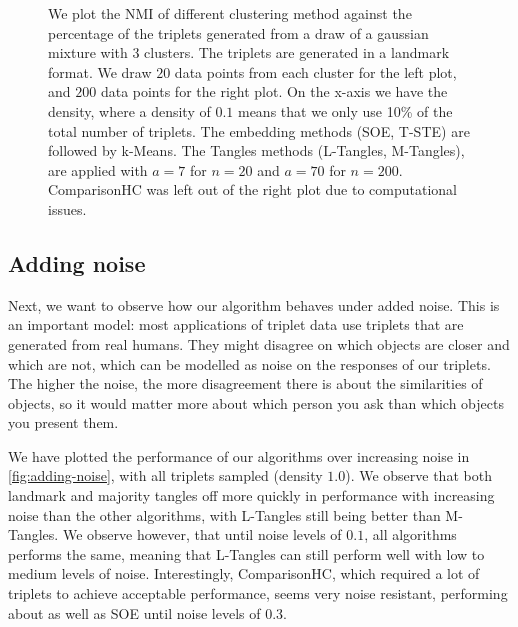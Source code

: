 \onecolumn
\begin{figure}[ht]
    \centering
    \caption{
        We plot the NMI of different clustering method against the percentage of the triplets generated from a draw of a gaussian mixture with $3$ clusters. The triplets are generated in a landmark format.
        We draw $20$ data points from each cluster for the left plot, and $200$ data points for the right plot.
        On the x-axis we have the density, where a density of $0.1$ means that we only use 10\% of the total number of triplets. The embedding methods (SOE, T-STE) are 
        followed by k-Means. The Tangles methods (L-Tangles, M-Tangles), are applied with $a=7$ for $n=20$ and $a=70$ for $n=200$. ComparisonHC was left out of the right plot due to computational issues.}
    \label{fig:density-change}
\end{figure}


\subsection{Adding noise}\label{sec:adding-noise}
Next, we want to observe how our algorithm behaves under added noise. This is an important model: most applications of triplet data use triplets that are generated from
real humans. They might disagree on which objects are closer and which are not, which can be modelled as noise on the responses of our triplets. The higher the noise, 
the more disagreement there is about the similarities of objects, so it would matter more about which person you ask than which objects you present them. 

We have plotted the performance of our algorithms over increasing noise in \autoref{fig:adding-noise}, 
with all triplets sampled (density $1.0$). 
We observe that both landmark and majority tangles off more quickly in performance with increasing noise 
than the other algorithms, with L-Tangles still being better than M-Tangles. 
We observe however, that until noise levels of $0.1$, all algorithms performs the same, meaning that L-Tangles can still perform well with low to medium levels of noise. Interestingly, ComparisonHC, which 
required a lot of triplets to achieve acceptable performance, seems 
very noise resistant, performing about as well as SOE until noise levels of 0.3.

